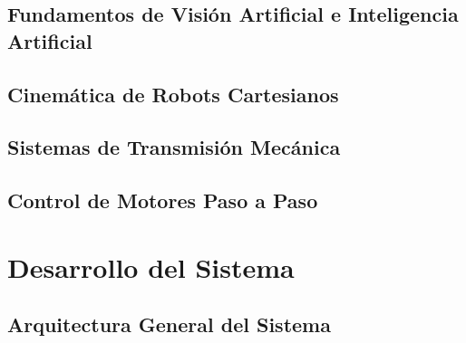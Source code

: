 \documentclass[a4paper,12pt]{report}
\begin{document}
\section{Fundamentos de Visión Artificial e Inteligencia Artificial}






\section{Cinemática de Robots Cartesianos}




\section{Sistemas de Transmisión Mecánica}




\section{Control de Motores Paso a Paso}




\chapter{Desarrollo del Sistema}

\section{Arquitectura General del Sistema}




\end{document}
